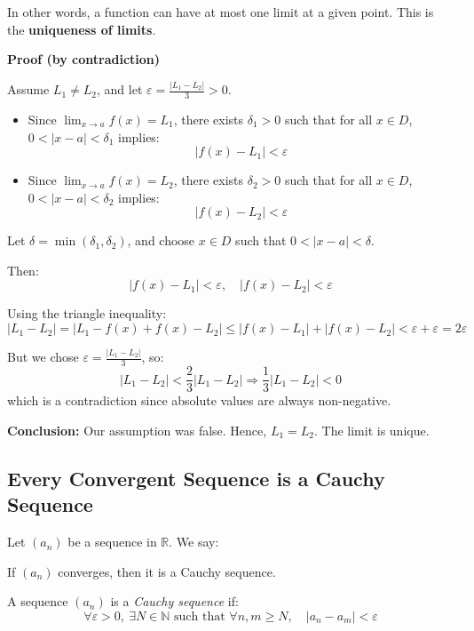 In other words, a function can have at most one limit at a given point. This is the \textbf{uniqueness of limits}.

\textbf{Proof (by contradiction)}

Assume \( L_1 \ne L_2 \), and let \( \varepsilon = \frac{|L_1 - L_2|}{3} > 0 \).

\begin{itemize}[label=\(-\)]
    \item Since \( \lim_{x \to a} f(x) = L_1 \), there exists \( \delta_1 > 0 \) such that for all \( x \in D \), \( 0 < |x - a| < \delta_1 \) implies:
    \[
    |f(x) - L_1| < \varepsilon
    \]
    
    \item Since \( \lim_{x \to a} f(x) = L_2 \), there exists \( \delta_2 > 0 \) such that for all \( x \in D \), \( 0 < |x - a| < \delta_2 \) implies:
    \[
    |f(x) - L_2| < \varepsilon
    \]
\end{itemize}

Let \( \delta = \min(\delta_1, \delta_2) \), and choose \( x \in D \) such that \( 0 < |x - a| < \delta \).

Then:
\[
|f(x) - L_1| < \varepsilon, \quad |f(x) - L_2| < \varepsilon
\]

Using the triangle inequality:
\[
|L_1 - L_2| = |L_1 - f(x) + f(x) - L_2| \le |f(x) - L_1| + |f(x) - L_2| < \varepsilon + \varepsilon = 2\varepsilon
\]

But we chose \( \varepsilon = \frac{|L_1 - L_2|}{3} \), so:
\[
|L_1 - L_2| < \frac{2}{3}|L_1 - L_2| \Rightarrow \frac{1}{3}|L_1 - L_2| < 0
\]
which is a contradiction since absolute values are always non-negative.

\textbf{Conclusion:} Our assumption was false. Hence, \( L_1 = L_2 \). The limit is unique.

\QED

\subsection{Every Convergent Sequence is a Cauchy Sequence}

Let \( (a_n) \) be a sequence in \( \mathbb{R} \). We say:

If \( (a_n) \) converges, then it is a Cauchy sequence.

A sequence \( (a_n) \) is a \emph{Cauchy sequence} if:
\[
\forall \varepsilon > 0, \ \exists N \in \mathbb{N} \text{ such that } \forall n, m \ge N, \quad |a_n - a_m| < \varepsilon
\]

